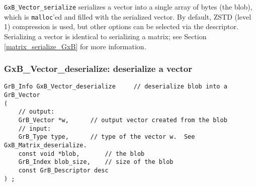 \documentclass[12pt]{article}
\begin{document}
\verb'GxB_Vector_serialize' serializes a vector into a single array of bytes
(the blob), which is \verb'malloc''ed and filled with the serialized vector.
By default, ZSTD (level 1) compression is used, but other options can be
selected via the descriptor.  Serializing a vector is identical to serializing
a matrix; see Section \ref{matrix_serialize_GxB} for more information.

\newpage

%

\subsubsection{{\sf GxB\_Vector\_deserialize:}    deserialize a vector}
\label{vector_deserialize_GxB}

\begin{mdframed}[userdefinedwidth=6in]
{\footnotesize
\begin{verbatim}
GrB_Info GxB_Vector_deserialize     // deserialize blob into a GrB_Vector
(
    // output:
    GrB_Vector *w,      // output vector created from the blob
    // input:
    GrB_Type type,      // type of the vector w.  See GxB_Matrix_deserialize.
    const void *blob,       // the blob
    GrB_Index blob_size,    // size of the blob
    const GrB_Descriptor desc
) ;
\end{verbatim}
} \end{mdframed}
\end{document}
